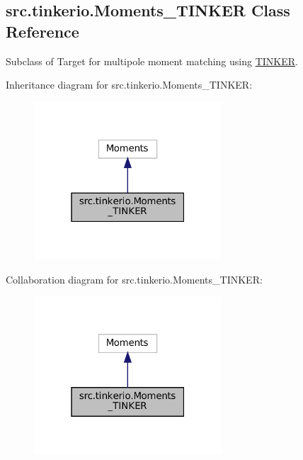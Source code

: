 \hypertarget{classsrc_1_1tinkerio_1_1Moments__TINKER}{}\subsection{src.\+tinkerio.\+Moments\+\_\+\+T\+I\+N\+K\+ER Class Reference}
\label{classsrc_1_1tinkerio_1_1Moments__TINKER}


Subclass of Target for multipole moment matching using \hyperlink{classsrc_1_1tinkerio_1_1TINKER}{T\+I\+N\+K\+ER}.  




Inheritance diagram for src.\+tinkerio.\+Moments\+\_\+\+T\+I\+N\+K\+ER\+:
\nopagebreak
\begin{figure}[H]
\begin{center}
\leavevmode
\includegraphics[width=199pt]{classsrc_1_1tinkerio_1_1Moments__TINKER__inherit__graph}
\end{center}
\end{figure}


Collaboration diagram for src.\+tinkerio.\+Moments\+\_\+\+T\+I\+N\+K\+ER\+:
\nopagebreak
\begin{figure}[H]
\begin{center}
\leavevmode
\includegraphics[width=199pt]{classsrc_1_1tinkerio_1_1Moments__TINKER__coll__graph}
\end{center}
\end{figure}
